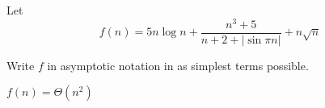 \begin{prob}
    Let
    \[
        f(n) = 5 n \log n +
        \frac{n^3 + 5}{n + 2 + |\sin \pi n|}
        +
        n \sqrt n
    \]

    Write $f$ in asymptotic notation in as simplest terms possible.

    \begin{soln}
        $f(n) = \Theta(n^2)$
    \end{soln}

\end{prob}
